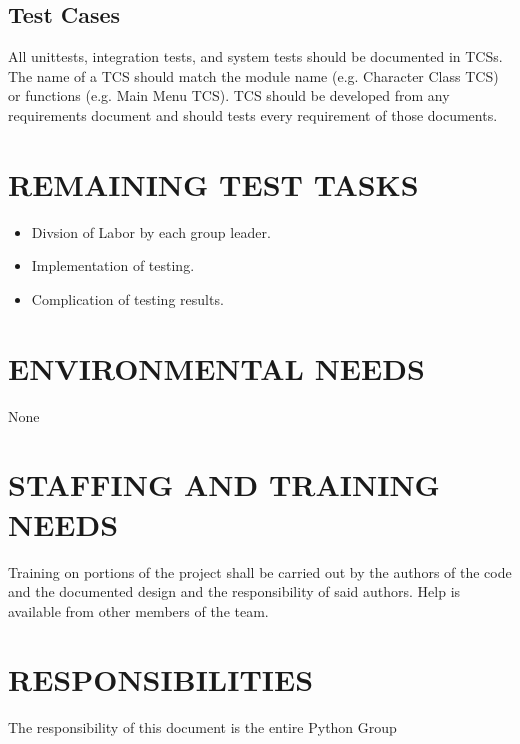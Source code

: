 \documentclass[report]{article}
\begin{document}
\subsection{Test Cases}

All unittests, integration tests, and system tests should be documented in TCSs. The name of a TCS should match the module name (e.g. Character Class TCS) or functions (e.g. Main Menu TCS). TCS should be developed from any requirements document and should tests every requirement of those documents.

\section[REMAINING TEST TASKS]{REMAINING TEST TASKS}

\begin{itemize}
\item Divsion of Labor by each group leader.
\item Implementation of testing.
\item Complication of testing results.
\end{itemize}

\section[EVIRONMENTAL NEEDS]{ENVIRONMENTAL NEEDS}
None

\section[STAFFING AND TRAINING NEEDS]{STAFFING AND TRAINING NEEDS}
Training on portions of the project shall be carried out by the authors of the code and the documented design and the responsibility of said authors. Help is available from other members of the team.


\section[RESPONSIBILITIES]{RESPONSIBILITIES}

The responsibility of this document is the entire Python Group
\end{document}
